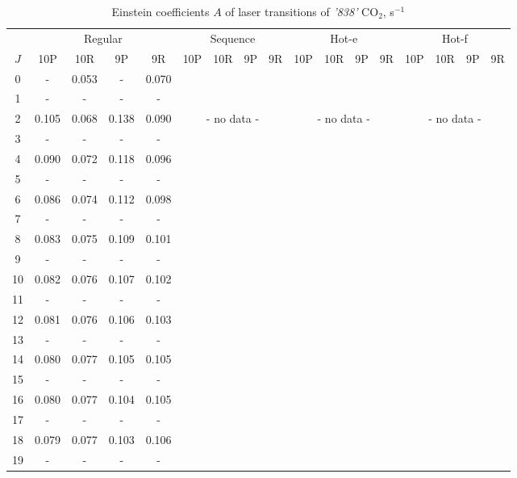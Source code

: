\documentclass{report}
\begin{document}
\begin{table}
\centering
\caption{Einstein coefficients $A$ of laser transitions of \textit{'838'} CO$_2$, s$^{-1}$}
\scriptsize
\begin{tabular}{|c|cccc|cccc|cccc|cccc|}
\hline
& \multicolumn{4}{c|}{Regular}& \multicolumn{4}{c|}{Sequence}& \multicolumn{4}{c|}{Hot-e}& \multicolumn{4}{c|}{Hot-f}\\
$J$ & 10P & 10R & 9P & 9R & 10P & 10R & 9P & 9R & 10P & 10R & 9P & 9R & 10P & 10R & 9P & 9R\\ 
\hline
0  &   -   & 0.053 &   -   & 0.070 & & & & & & & & & & & &\\
1  &   -   &   -   &   -   &   -   & & & & & & & & & & & &\\
2  & 0.105 & 0.068 & 0.138 & 0.090 & \multicolumn{4}{c|}{- no data -}& \multicolumn{4}{c|}{- no data -}& \multicolumn{4}{c|}{- no data -}\\
3  &   -   &   -   &   -   &   -   & & & & & & & & & & & &\\
4  & 0.090 & 0.072 & 0.118 & 0.096 & & & & & & & & & & & &\\
5  &   -   &   -   &   -   &   -   & & & & & & & & & & & &\\
6  & 0.086 & 0.074 & 0.112 & 0.098 & & & & & & & & & & & &\\
7  &   -   &   -   &   -   &   -   & & & & & & & & & & & &\\
8  & 0.083 & 0.075 & 0.109 & 0.101 & & & & & & & & & & & &\\
9  &   -   &   -   &   -   &   -   & & & & & & & & & & & &\\
10 & 0.082 & 0.076 & 0.107 & 0.102 & & & & & & & & & & & &\\
11 &   -   &   -   &   -   &   -   & & & & & & & & & & & &\\
12 & 0.081 & 0.076 & 0.106 & 0.103 & & & & & & & & & & & &\\
13 &   -   &   -   &   -   &   -   & & & & & & & & & & & &\\
14 & 0.080 & 0.077 & 0.105 & 0.105 & & & & & & & & & & & &\\
15 &   -   &   -   &   -   &   -   & & & & & & & & & & & &\\
16 & 0.080 & 0.077 & 0.104 & 0.105 & & & & & & & & & & & &\\
17 &   -   &   -   &   -   &   -   & & & & & & & & & & & &\\
18 & 0.079 & 0.077 & 0.103 & 0.106 & & & & & & & & & & & &\\
19 &   -   &   -   &   -   &   -   & & & & & & & & & & & &\\

\end{tabular}
\end{table}
\end{document}
